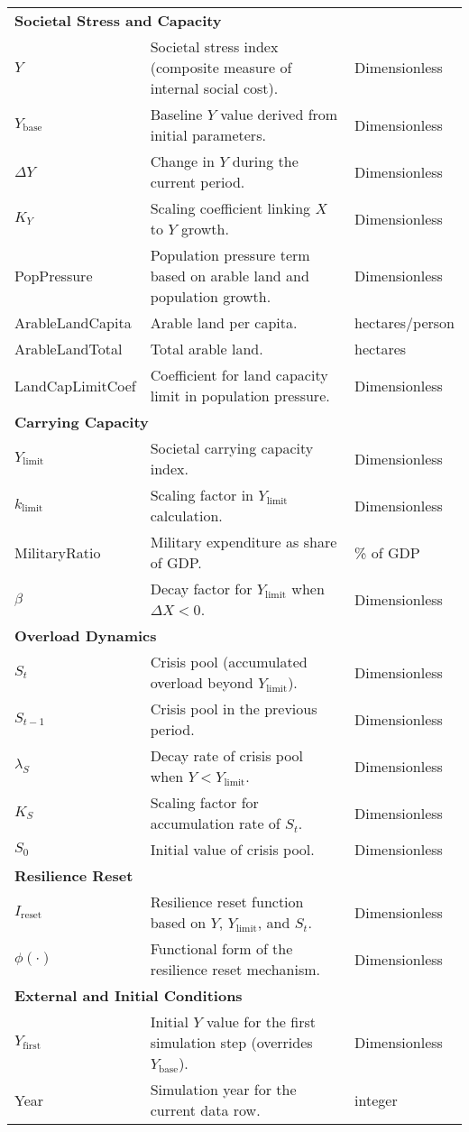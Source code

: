 \documentclass{article}
\begin{document}
\begin{longtable}{p{3cm} p{8cm} p{3cm}}
\multicolumn{3}{l}{\textbf{Societal Stress and Capacity}} \\
$Y$ & Societal stress index (composite measure of internal social cost). & Dimensionless \\
$Y_{\mathrm{base}}$ & Baseline $Y$ value derived from initial parameters. & Dimensionless \\
$\Delta Y$ & Change in $Y$ during the current period. & Dimensionless \\
$K_Y$ & Scaling coefficient linking $X$ to $Y$ growth. & Dimensionless \\
PopPressure & Population pressure term based on arable land and population growth. & Dimensionless \\
ArableLandCapita & Arable land per capita. & hectares/person \\
ArableLandTotal & Total arable land. & hectares \\
LandCapLimitCoef & Coefficient for land capacity limit in population pressure. & Dimensionless \\

\multicolumn{3}{l}{\textbf{Carrying Capacity}} \\
$Y_{\mathrm{limit}}$ & Societal carrying capacity index. & Dimensionless \\
$k_{\mathrm{limit}}$ & Scaling factor in $Y_{\mathrm{limit}}$ calculation. & Dimensionless \\
MilitaryRatio & Military expenditure as share of GDP. & \% of GDP \\
$\beta$ & Decay factor for $Y_{\mathrm{limit}}$ when $\Delta X < 0$. & Dimensionless \\

\multicolumn{3}{l}{\textbf{Overload Dynamics}} \\
$S_t$ & Crisis pool (accumulated overload beyond $Y_{\mathrm{limit}}$). & Dimensionless \\
$S_{t-1}$ & Crisis pool in the previous period. & Dimensionless \\
$\lambda_S$ & Decay rate of crisis pool when $Y < Y_{\mathrm{limit}}$. & Dimensionless \\
$K_S$ & Scaling factor for accumulation rate of $S_t$. & Dimensionless \\
$S_0$ & Initial value of crisis pool. & Dimensionless \\

\multicolumn{3}{l}{\textbf{Resilience Reset}} \\
$I_{\mathrm{reset}}$ & Resilience reset function based on $Y$, $Y_{\mathrm{limit}}$, and $S_t$. & Dimensionless \\
$\phi(\cdot)$ & Functional form of the resilience reset mechanism. & Dimensionless \\

\multicolumn{3}{l}{\textbf{External and Initial Conditions}} \\
$Y_{\mathrm{first}}$ & Initial $Y$ value for the first simulation step (overrides $Y_{\mathrm{base}}$). & Dimensionless \\
Year & Simulation year for the current data row. & integer \\

\end{longtable}
\end{document}
